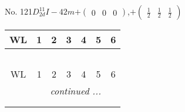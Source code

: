 \documentclass[fleqn,9pt,landscape]{jsarticle}
\begin{document}
\newpage
No. 121\quad$D_{2d}^{11}$\quad$I-42m$\quad[ tetragonal ]\quad$+\begin{pmatrix} 0 & 0 & 0 \end{pmatrix}$,\quad $+\begin{pmatrix} \frac{1}{2} & \frac{1}{2} & \frac{1}{2} \end{pmatrix}$
\begin{center}
\renewcommand{\arraystretch}{1.2}
\begin{longtable}{ccccccc}
 \hline \hline
WL & 1 & 2 & 3 & 4 & 5 & 6 \\ \hline \endfirsthead

\multicolumn{6}{l}{\tablename\ \thetable{}} \\
 \hline \hline
WL & 1 & 2 & 3 & 4 & 5 & 6 \\ \hline \endhead

 \hline \hline
\multicolumn{6}{r}{\footnotesize\it continued ...} \\ \endfoot

 \hline \hline
\multicolumn{6}{r}{} \\ \endlastfoot


\end{longtable}
\end{center}
\end{document}
